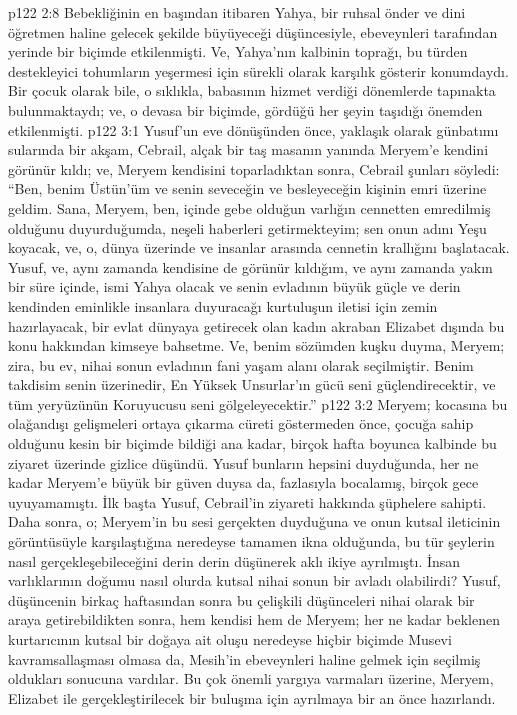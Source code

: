 \vs p122 2:8 Bebekliğinin en başından itibaren Yahya, bir ruhsal önder ve dini öğretmen haline gelecek şekilde büyüyeceği düşüncesiyle, ebeveynleri tarafından yerinde bir biçimde etkilenmişti. Ve, Yahya’nın kalbinin toprağı, bu türden destekleyici tohumların yeşermesi için sürekli olarak karşılık gösterir konumdaydı. Bir çocuk olarak bile, o sıklıkla, babasının hizmet verdiği dönemlerde tapınakta bulunmaktaydı; ve, o devasa bir biçimde, gördüğü her şeyin taşıdığı önemden etkilenmişti.
\vs p122 3:1 Yusuf’un eve dönüşünden önce, yaklaşık olarak günbatımı sularında bir akşam, Cebrail, alçak bir taş masanın yanında Meryem’e kendini görünür kıldı; ve, Meryem kendisini toparladıktan sonra, Cebrail şunları söyledi: “Ben, benim Üstün’üm ve senin seveceğin ve besleyeceğin kişinin emri üzerine geldim. Sana, Meryem, ben, içinde gebe olduğun varlığın cennetten emredilmiş olduğunu duyurduğumda, neşeli haberleri getirmekteyim; sen onun adını Yeşu koyacak, ve, o, dünya üzerinde ve insanlar arasında cennetin krallığını başlatacak. Yusuf, ve, aynı zamanda kendisine de görünür kıldığım, ve aynı zamanda yakın bir süre içinde, ismi Yahya olacak ve senin evladının büyük güçle ve derin kendinden eminlikle insanlara duyuracağı kurtuluşun iletisi için zemin hazırlayacak, bir evlat dünyaya getirecek olan kadın akraban Elizabet dışında bu konu hakkından kimseye bahsetme. Ve, benim sözümden kuşku duyma, Meryem; zira, bu ev, nihai sonun evladının fani yaşam alanı olarak seçilmiştir. Benim takdisim senin üzerinedir, En Yüksek Unsurlar’ın gücü seni güçlendirecektir, ve tüm yeryüzünün Koruyucusu seni gölgeleyecektir.”
\vs p122 3:2 Meryem; kocasına bu olağandışı gelişmeleri ortaya çıkarma cüreti göstermeden önce, çocuğa sahip olduğunu kesin bir biçimde bildiği ana kadar, birçok hafta boyunca kalbinde bu ziyaret üzerinde gizlice düşündü. Yusuf bunların hepsini duyduğunda, her ne kadar Meryem’e büyük bir güven duysa da, fazlasıyla bocalamış, birçok gece uyuyamamıştı. İlk başta Yusuf, Cebrail’in ziyareti hakkında şüphelere sahipti. Daha sonra, o; Meryem’in bu sesi gerçekten duyduğuna ve onun kutsal ileticinin görüntüsüyle karşılaştığına neredeyse tamamen ikna olduğunda, bu tür şeylerin nasıl gerçekleşebileceğini derin derin düşünerek aklı ikiye ayrılmıştı. İnsan varlıklarının doğumu nasıl olurda kutsal nihai sonun bir avladı olabilirdi? Yusuf, düşüncenin birkaç haftasından sonra bu çelişkili düşünceleri nihai olarak bir araya getirebildikten sonra, hem kendisi hem de Meryem; her ne kadar beklenen kurtarıcının kutsal bir doğaya ait oluşu neredeyse hiçbir biçimde Musevi kavramsallaşması olmasa da, Mesih’in ebeveynleri haline gelmek için seçilmiş oldukları sonucuna vardılar. Bu çok önemli yargıya varmaları üzerine, Meryem, Elizabet ile gerçekleştirilecek bir buluşma için ayrılmaya bir an önce hazırlandı.
